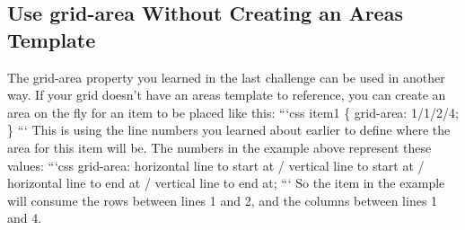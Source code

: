 \documentclass{article}%
\begin{document}
%
\subsection{Use grid{-}area Without Creating an Areas Template}%
\label{subsec:Usegrid{-}areaWithoutCreatinganAreasTemplate}%
The grid{-}area property you learned in the last challenge can be used in another way. If your grid doesn't have an areas template to reference, you can create an area on the fly for an item to be placed like this:\newline%
```css\newline%
item1 \{ grid{-}area: 1/1/2/4; \}\newline%
```\newline%
This is using the line numbers you learned about earlier to define where the area for this item will be. The numbers in the example above represent these values:\newline%
```css\newline%
grid{-}area: horizontal line to start at / vertical line to start at / horizontal line to end at / vertical line to end at;\newline%
```\newline%
So the item in the example will consume the rows between lines 1 and 2, and the columns between lines 1 and 4.\newline%

%
\end{document}
